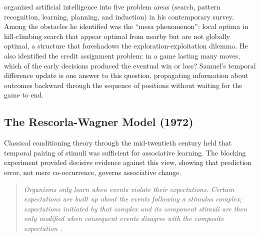 \citet{Minsky1961} organized artificial intelligence into five problem areas (search, pattern recognition, learning, planning, and induction) in his contemporary survey. Among the obstacles he identified was the ``mesa phenomenon'': local optima in hill-climbing search that appear optimal from nearby but are not globally optimal, a structure that foreshadows the exploration-exploitation dilemma. He also identified the credit assignment problem: in a game lasting many moves, which of the early decisions produced the eventual win or loss? Samuel's temporal difference update is one answer to this question, propagating information about outcomes backward through the sequence of positions without waiting for the game to end.

\subsection{The Rescorla-Wagner Model (1972)}

Classical conditioning theory through the mid-twentieth century held that temporal pairing of stimuli was sufficient for associative learning. The blocking experiment provided decisive evidence against this view, showing that prediction error, not mere co-occurrence, governs associative change.

\begin{quote}\itshape
Organisms only learn when events violate their expectations. Certain expectations are built up about the events following a stimulus complex; expectations initiated by that complex and its component stimuli are then only modified when consequent events disagree with the composite expectation \citep{RescorlaWagner1972}.
\end{quote}

